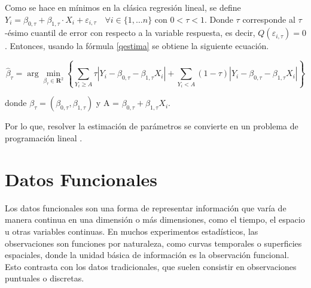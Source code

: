 
\begin{obs}
    Como se hace en mínimos en la clásica regresión lineal, se define $Y_i=\beta_{0, \tau}+\beta_{1, \tau} \cdot X_i+\varepsilon_{i, \tau} \quad \forall i \in\{1, \dots n\}$ con $0 < \tau < 1$. Donde $\tau$ corresponde al $\tau$-ésimo cuantil de error con respecto a la variable respuesta, es decir, $Q(\varepsilon_{i, \tau}) = 0$. Entonces, usando la fórmula \eqref{qestima} se obtiene la siguiente ecuación.

    \begin{equation}
        \hat{\beta}_\tau=\arg \min _{\beta_\tau \in \mathbf{R}^2}\left\{\sum_{Y_i \geq A} \tau \left|Y_i-\beta_{0, \tau}-\beta_{1, \tau} X_i\right|+\sum_{Y_i<A}(1-\tau) \left|Y_i-\beta_{0, \tau}-\beta_{1, \tau}  X_i\right|\right\}
    \end{equation}

    donde $\beta_\tau = (\beta_{0, \tau}, \beta_{1, \tau} )$ y A = $\beta_{0, \tau} + \beta_{1, \tau}X_i $.

    Por lo que, resolver la estimación de parámetros se convierte en un problema de programación lineal \cite{RegLinealCuantil}.
\end{obs}


\section{Datos Funcionales}

Los datos funcionales son una forma de representar información que varía de manera continua en una dimensión o más dimensiones, como el tiempo, el espacio u otras variables continuas. En muchos experimentos estadísticos, las observaciones son funciones por naturaleza, como curvas temporales o superficies espaciales, donde la unidad básica de información es la observación funcional. Esto contrasta con los datos tradicionales, que suelen consistir en observaciones puntuales o discretas.

